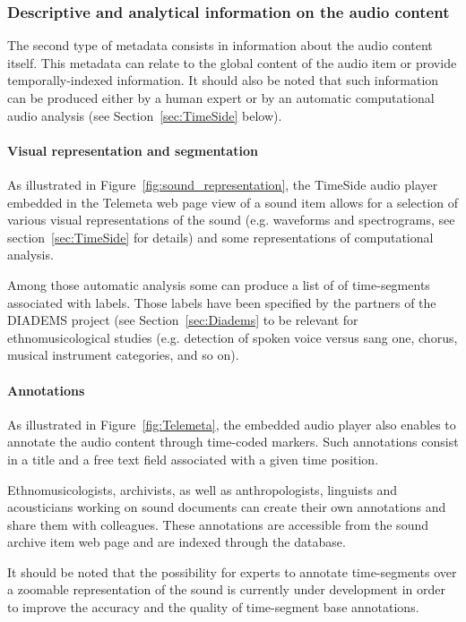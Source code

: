 \documentclass{sig-alternate}
\newcommand{\squeezeup}{\vspace{-2.5mm}}
\begin{document}
\subsubsection{Descriptive and analytical information on the audio content}
The second type of metadata consists in information about the audio content itself. This metadata can relate to the global content of the audio item or provide temporally-indexed information. It should also be noted that such information can be produced either by a human expert or by an automatic computational audio analysis (see Section~\ref{sec:TimeSide} below).

\squeezeup\paragraph{Visual representation and segmentation}
As illustrated in Figure~\ref{fig:sound_representation}, the TimeSide audio player embedded in the Telemeta web page view of a sound item allows for a selection of various visual representations of the sound (e.g. waveforms and spectrograms, see section~\ref{sec:TimeSide} for details) and some representations of computational analysis.

Among those automatic analysis some can produce a list of of time-segments associated with labels.
Those labels have been specified by the partners of the DIADEMS project (see Section~\ref{sec:Diadems} to be relevant for ethnomusicological studies (e.g. detection of spoken voice versus sang one, chorus, musical instrument categories, and so on).

\squeezeup\paragraph{Annotations}
As illustrated in Figure~\ref{fig:Telemeta}, the embedded audio player also enables to annotate the audio content through time-coded markers.
Such annotations consist in a title and a free text field associated with a given time position.

Ethnomusicologists, archivists, as well as anthropologists, linguists and acousticians working on sound documents can create their own annotations and share them with colleagues. These annotations are accessible from the sound archive item web page and are indexed through the database.

It should be noted that the possibility for experts to annotate time-segments over a zoomable representation of the sound is currently under development in order to improve the accuracy and the quality of time-segment base annotations.
\end{document}
